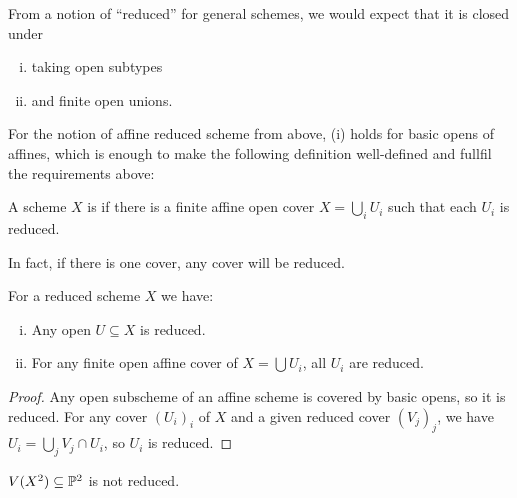 From a notion of ``reduced'' for general schemes, we would expect that it is closed under
\begin{enumerate}[(i)]
\item taking open subtypes
\item and finite open unions.
\end{enumerate}

For the notion of affine reduced scheme from above, (i) holds for basic opens of affines,
which is enough to make the following definition well-defined and fullfil the requirements above:

\begin{definition}
  A scheme $X$ is  if there is a finite affine open cover $X=\bigcup_i U_i$ such that each $U_i$ is reduced.
\end{definition}

In fact, if there is one cover, any cover will be reduced.

\begin{remark}
  For a reduced scheme $X$ we have:
  \begin{enumerate}[(i)]
  \item Any open $U\subseteq X$ is reduced.
  \item For any finite open affine cover of $X=\bigcup U_i$, all $U_i$ are reduced.
  \end{enumerate}
\end{remark}

\begin{proof}
  Any open subscheme of an affine scheme is covered by basic opens, so it is reduced.
  For any cover $(U_i)_i$ of $X$ and a given reduced cover $(V_j)_j$, we have $U_i=\bigcup_j V_j\cap U_i$, so $U_i$ is reduced.
\end{proof}

\begin{example}
  $V(X^2)\subseteq \mathbb{P}^2$ is not reduced.
\end{example}